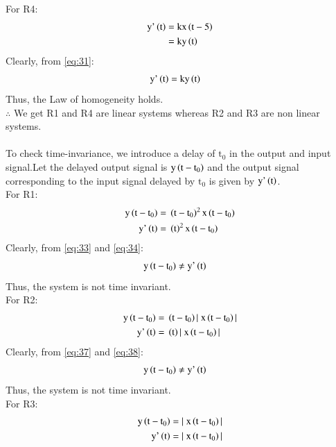 \documentclass[journal,12pt,twocolumn]{IEEEtran}
\begin{document}
For R4:
\begin{align}
\label{eq:30}
 \text{y'}\left(\text{t}\right) ={}& \text{k}\text{x}\left(\text{t}-5\right)\\
 \label{eq:31}
   ={}& \text{k}\text{y}\left(\text{t}\right)
\end{align}
Clearly, from \eqref{eq:31}:
\begin{align}
\label{eq:32}
    \text{y'}\left(\text{t}\right) ={}& \text{k}\text{y}\left(\text{t}\right)
\end{align}
Thus, the Law of homogeneity holds.\\
$\therefore$ We get R1 and R4 are linear systems whereas R2 and R3 are non linear systems.\\
\\
To check time-invariance, we introduce a delay of $\text{t}_{0}$ in the output and input signal.Let the delayed output signal is $\text{y}\left(\text{t}-\text{t}_{0}\right)$ and the output signal corresponding to the input signal delayed by $\text{t}_{0}$ is given by $\text{y'}\left(\text{t}\right)$.\\
For R1:
\begin{align}
\label{eq:33}
 \text{y}\left(\text{t}-\text{t}_{0}\right) ={}& \left(\text{t}-\text{t}_{0}\right)^2\text{x}\left(\text{t}-\text{t}_{0}\right)\\
 \label{eq:34}
  \text{y'}\left(\text{t}\right)={}& \left(\text{t}\right)^2\text{x}\left(\text{t}-\text{t}_{0}\right)
\end{align}
Clearly, from \eqref{eq:33} and \eqref{eq:34}:
\begin{align}
\label{eq:35}
    \text{y}\left(\text{t}-\text{t}_{0}\right) \neq{}& \text{y'}\left(\text{t}\right)
\end{align}
Thus, the system is not time invariant.\\
For R2:
\begin{align}
\label{eq:36}
 \text{y}\left(\text{t}-\text{t}_{0}\right) ={}& \left(\text{t}-\text{t}_{0}\right)|\;\text{x}\left(\text{t}-\text{t}_{0}\right)|\\
 \label{eq:37}
  \text{y'}\left(\text{t}\right)={}& \left(\text{t}\right)|\;\text{x}\left(\text{t}-\text{t}_{0}\right)|
\end{align}
Clearly, from \eqref{eq:37} and \eqref{eq:38}:
\begin{align}
\label{eq:38}
    \text{y}\left(\text{t}-\text{t}_{0}\right) \neq{}& \text{y'}\left(\text{t}\right)
\end{align}
Thus, the system is not time invariant.\\
For R3:
\begin{align}
\label{eq:39}
 \text{y}\left(\text{t}-\text{t}_{0}\right) ={}& |\;\text{x}\left(\text{t}-\text{t}_{0}\right)|\\
 \label{eq:40}
  \text{y'}\left(\text{t}\right)={}& |\;\text{x}\left(\text{t}-\text{t}_{0}\right)|
\end{align}
\end{document}
